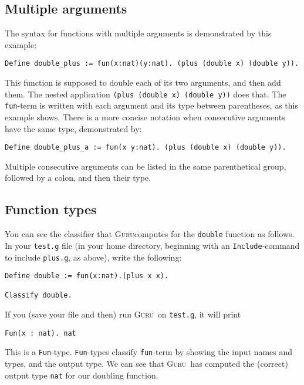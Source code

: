 \documentclass{book}[12pt]
\newcommand{\guru}[0]{\textsc{Guru}}
\begin{document}
\subsection{Multiple arguments}

The syntax for functions with multiple arguments is demonstrated
by this example:

\begin{verbatim}
Define double_plus := fun(x:nat)(y:nat). (plus (double x) (double y)).
\end{verbatim}

\noindent This function is supposed to double each of its two
arguments, and then add them.  The nested application \texttt{(plus
(double x) (double y))} does that.  The \texttt{fun}-term is
written with each argument and its type between parentheses, as this
example shows.  There is a more concise notation when consecutive
arguments have the same type, demonstrated by:

\begin{verbatim}
Define double_plus_a := fun(x y:nat). (plus (double x) (double y)).
\end{verbatim}

\noindent Multiple consecutive arguments can be listed in the same
parenthetical group, followed by a colon, and then their type.

\subsection{Function types}

You can see the classifier that \guru computes for the \texttt{double}
function as follows.  In your \texttt{test.g} file (in your home
directory, beginning with an \texttt{Include}-command to include
\texttt{plus.g}, as above), write the following:

\begin{verbatim}
Define double := fun(x:nat).(plus x x).

Classify double.
\end{verbatim}

\noindent If you (save your file and then) run \guru\ on \texttt{test.g},
it will print

\begin{verbatim}
Fun(x : nat). nat
\end{verbatim}

\noindent This is a \texttt{Fun}-type.  \texttt{Fun}-types classify
\texttt{fun}-term by showing the input names and types, and
the output type.  We can see that \guru\ has computed the (correct)
output type \texttt{nat} for our doubling function.
\end{document}
